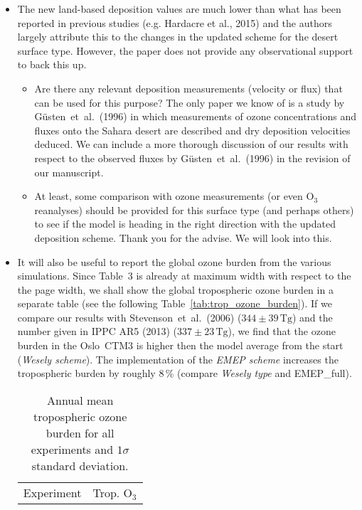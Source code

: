 \documentclass{scrartcl}
\begin{document}
\begin{itemize}
\begin{itemize}
  \item {\color{blue}  The new land-based deposition values are much lower than what has
    been reported in previous studies (e.g. Hardacre et al., 2015) and the authors largely
    attribute this to the changes in the updated scheme for the desert surface type. However,
    the paper does not provide any observational support to back this up. }
    \begin{itemize}
    \item {\color{blue}  Are there any relevant deposition measurements (velocity or flux) that can be used for this purpose?}
      The only paper we know of is a study by G\"{u}sten~et~al.~(1996) in which measurements of ozone concentrations
      and fluxes onto the Sahara desert are described and dry deposition velocities deduced. We can include a more
      thorough discussion of our results with respect to the observed fluxes by G\"{u}sten~et~al.~(1996) in the
      revision of our manuscript. 
    \item {\color{blue}  At least, some comparison with ozone measurements (or even $\mathrm{O_3}$ reanalyses)
      should be provided for this surface type (and perhaps others) to see if the model is
      heading in the right direction with the updated deposition scheme.}
      Thank you for the advise. We will look into this.
    \end{itemize}
  \item {\color{blue}  It will also be useful to report the global ozone burden from the various
    simulations.}
    Since Table~3 is already at maximum width with respect to the the page width, we shall show the global
    tropospheric ozone burden in a separate table (see the following Table~\ref{tab:trop_ozone_burden}). If we compare our results
    with Stevenson~et~al.~(2006)
    ($344\pm 39\,\mathrm{Tg}$) and the number given in IPPC AR5 (2013) ($337\pm 23\,\mathrm{Tg}$), we find
    that the ozone burden in the Oslo~CTM3 is higher then the model average from the start (\emph{Wesely scheme}).
    The implementation of the \emph{EMEP scheme}
    increases the tropospheric burden by roughly 8\,\% (compare \emph{Wesely type} and EMEP\_full).
    \begin{table*}[h]
        \caption{Annual mean tropospheric ozone burden for all experiments and $1 \sigma$ standard deviation.}
        \centering
        \begin{tabular}{lrcl}
          \hline
          Experiment & \multicolumn{3}{c}{Trop. $\mathrm{O_3}$}\\

\end{tabular}
\end{table*}
\end{itemize}
\end{itemize}
\end{document}

